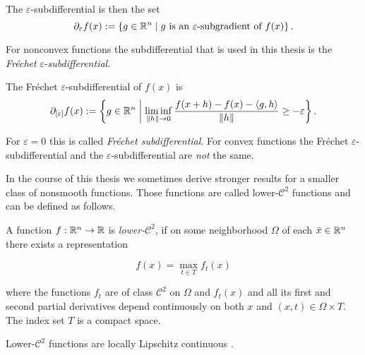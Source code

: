 The \(\varepsilon\)-subdifferential is then the set
\[ \partial_{\varepsilon} f(x) := \left\{g \in \mathbb{R}^n \mid g \text{ is an } \varepsilon \text{-subgradient of } f(x) \right\}. \]

For nonconvex functions the subdifferential that is used in this thesis is the \emph{Fr\'{e}chet} \(\varepsilon\)-\emph{subdifferential}.

\begin{definition}
	The Fr\'{e}chet \(\varepsilon\)-subdifferential of \(f(x)\) is
	\[ \partial_{[\varepsilon]}f(x) := \left\{ g \in \mathbb{R}^n \biggm| \liminf_{\|h\| \to 0} \frac{f(x+h)-f(x)-\langle g,h\rangle}{\|h\|}  \geq -\varepsilon\right\}. \]
\end{definition}

For \(\varepsilon = 0\) this is called \emph{Fr\'echet subdifferential}.
For convex functions the Fr\'echet \(\varepsilon\)-subdifferential and the \(\varepsilon\)-subdifferential are \emph{not} the same.

In the course of this thesis we sometimes derive stronger results for a smaller class of nonsmooth functions. Those functions are called lower-\(\mathcal{C}^2\) functions and can be defined as follows.

\begin{definition}
\label{def_low_C2}
	A function \(f:\mathbb{R}^n \to \mathbb{R}\) is \emph{lower-}\(\mathcal{C}^2\), if on some neighborhood \(\Omega\) of each \(\bar{x} \in \mathbb{R}^n\) there exists a representation 
	
	\[ f(x) = \max_{t\in T}f_t(x) \]
	
	where the functions \(f_t\) are of class \(\mathcal{C}^2\) on \(\Omega\) and \(f_t(x)\) and all its first and second partial derivatives depend continuously on both \(x\) and \((x,t) \in \Omega \times T\).
	The index set \(T\) is a compact space.
\end{definition}

Lower-\(\mathcal{C}^2\) functions are locally Lipschitz continuous \cite[Theorem 10.31, p. 448]{Rockafellar2009}.


